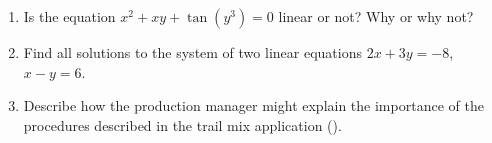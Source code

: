 \begin{enumerate}
\item Is the equation $x^2 + xy +\tan(y^3)=0$ linear or not?  Why or why not?
\item Find all solutions to the system of two linear equations $2x+3y=-8$, $x-y=6$.
\item Describe how the production manager might explain the importance of the procedures described in the trail mix application ().
\end{enumerate}